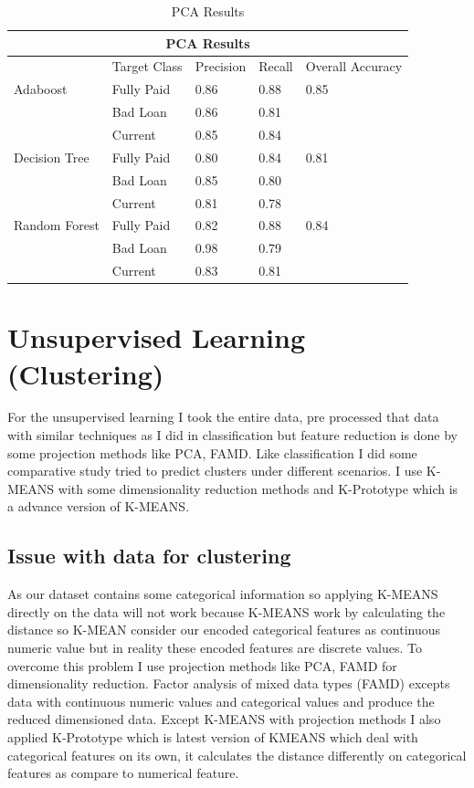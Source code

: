 \documentclass[12pt]{article}
\begin{document}
\begin{table}[h!]
	\centering
	\begin{tabular}{ |p{3cm}||p{2cm}|p{2cm}|p{2cm}|p{2cm}|  }
		\hline
		\multicolumn{5}{|c|}{PCA Results} \\
		\hline
		& Target Class & Precision & Recall & Overall Accuracy \\
		\hline
		Adaboost & Fully Paid &0.86 & 0.88 & 0.85\\
		& Bad Loan & 0.86 & 0.81 & \\
		& Current & 0.85 & 0.84 & \\
		\hline
		Decision Tree & Fully Paid & 0.80 & 0.84 & 0.81\\
		& Bad Loan & 0.85 &  0.80 & \\
		& Current &0.81 &  0.78 & \\
		\hline
		Random Forest & Fully Paid & 0.82 & 0.88 & 0.84\\
		& Bad Loan &0.98  & 0.79 & \\
		& Current & 0.83 & 0.81 & \\
		\hline
	\end{tabular}
	\caption{PCA Results}
	\label{table:pca_results}
\end{table}

\section{Unsupervised Learning (Clustering)}
For the unsupervised learning I took the entire data, pre processed that data with similar techniques as I did in classification but feature reduction is done by some projection methods like PCA, FAMD. Like classification I did some comparative study tried to predict clusters under different scenarios. I use K-MEANS with some dimensionality reduction methods and K-Prototype which is a advance version of K-MEANS.
\subsection{Issue with data for clustering}
As our dataset contains some categorical information so applying K-MEANS directly on the data will not work because K-MEANS work by calculating the distance so K-MEAN consider our encoded categorical features as continuous numeric value but in reality these encoded features are discrete values. To overcome this problem I use projection methods like PCA, FAMD for dimensionality reduction. Factor analysis of mixed data types (FAMD) excepts data with continuous numeric values and categorical values and produce the reduced dimensioned data. Except K-MEANS with projection methods I also applied K-Prototype which is latest version of KMEANS which deal with categorical features on its own, it calculates the distance differently on categorical features as compare to numerical feature.
\end{document}
